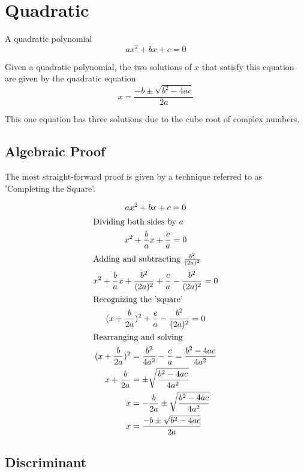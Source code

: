 \documentclass[a4paper]{article}
\begin{document}
\section{Quadratic}

\begin{definition}\label{quad def}
A quadratic polynomial 
$$
ax^2 + bx + c = 0
$$
\end{definition}

Given a quadratic polynomial, the two solutions of $x$ that satisfy this equation are given by the quadratic equation
\begin{equation}
\boxed{
x = \frac{-b \pm \sqrt{b^2 - 4ac}}{2a}
}
\end{equation}

This one equation has three solutions due to the cube root of complex numbers.

\subsection{Algebraic Proof}
The most straight-forward proof is given by a technique referred to as 'Completing the Square'.

\begin{gather*}
ax^2 + bx + c = 0\\
\shortintertext{Dividing both sides by $a$}
x^2 + \frac{b}{a}x + \frac{c}{a} = 0\\
\shortintertext{Adding and subtracting $\frac{b^2}{(2a)^2}$}
x^2 + \frac{b}{a}x + \frac{b^2}{(2a)^2} +  \frac{c}{a} - \frac{b^2}{(2a)^2} = 0\\
\shortintertext{Recognizing the 'square'}
(x+ \frac{b}{2a})^2 +  \frac{c}{a} - \frac{b^2}{(2a)^2} = 0\\
\shortintertext{Rearranging and solving}
\begin{alignedat}{2}
(x + \frac{b}{2a})^2 &= \frac{b^2}{4a^2}-  \frac{c}{a}  = \frac{b^2-4ac}{4a^2}\\
x + \frac{b}{2a} &=\pm \sqrt{ \frac{b^2 - 4ac}{4a^2}}\\
x  &= - \frac{b}{2a} \pm \sqrt{ \frac{b^2 - 4ac}{4a^2}}\\
x  &= \frac{-b \pm \sqrt{b^2 - 4ac}}{2a}\\
\end{alignedat}
\end{gather*}

\subsection{Discriminant}
\end{document}
